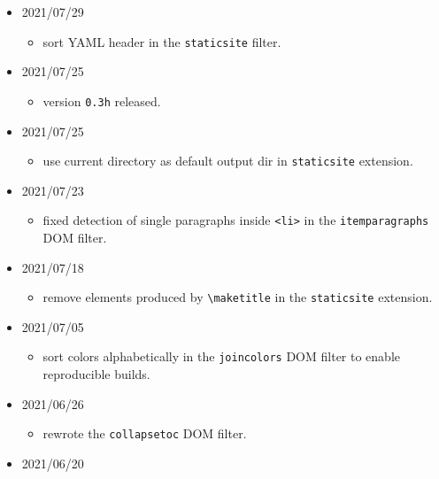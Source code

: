 \begin{itemize}
  \begin{itemize}
  \tightlist
  \item
    correctly set dimensions for \texttt{SVG} images in the \texttt{ODT}
    format.
  \end{itemize}
\item
  2021/07/29

  \begin{itemize}
  \tightlist
  \item
    sort YAML header in the \texttt{staticsite} filter.
  \end{itemize}
\item
  2021/07/25

  \begin{itemize}
  \tightlist
  \item
    version \texttt{0.3h} released.
  \end{itemize}
\item
  2021/07/25

  \begin{itemize}
  \tightlist
  \item
    use current directory as default output dir in \texttt{staticsite}
    extension.
  \end{itemize}
\item
  2021/07/23

  \begin{itemize}
  \tightlist
  \item
    fixed detection of single paragraphs inside
    \texttt{\textless{}li\textgreater{}} in the \texttt{itemparagraphs}
    DOM filter.
  \end{itemize}
\item
  2021/07/18

  \begin{itemize}
  \tightlist
  \item
    remove elements produced by \texttt{\textbackslash{}maketitle} in
    the \texttt{staticsite} extension.
  \end{itemize}
\item
  2021/07/05

  \begin{itemize}
  \tightlist
  \item
    sort colors alphabetically in the \texttt{joincolors} DOM filter to
    enable reproducible builds.
  \end{itemize}
\item
  2021/06/26

  \begin{itemize}
  \tightlist
  \item
    rewrote the \texttt{collapsetoc} DOM filter.
  \end{itemize}
\item
  2021/06/20


\end{itemize}
